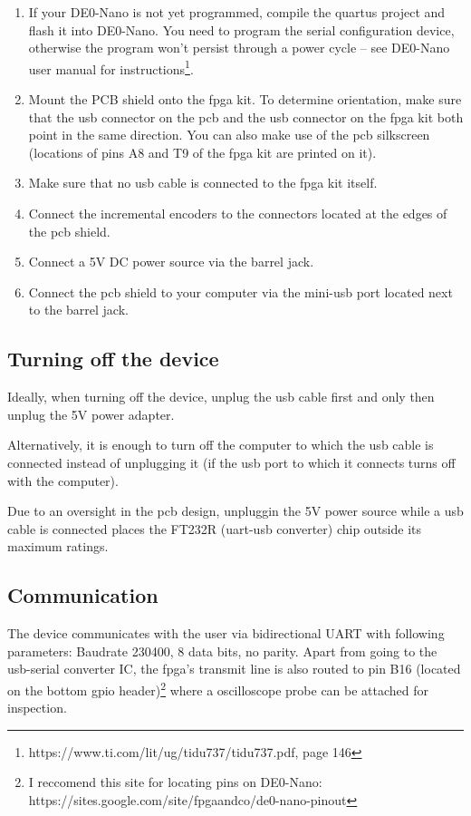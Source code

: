 \documentclass[twoside]{article}
\begin{document}
\begin{enumerate}
\item If your DE0-Nano is not yet programmed, compile the quartus project and flash it into DE0-Nano. You need to program the serial configuration device, otherwise the program won't persist through a power cycle -- see DE0-Nano user manual for instructions\footnote{https://www.ti.com/lit/ug/tidu737/tidu737.pdf, page 146}.
\item Mount the PCB shield onto the fpga kit. To determine orientation, make sure that the usb connector on the pcb and the usb connector on the fpga kit both point in the same direction. You can also make use of the pcb silkscreen (locations of pins A8 and T9 of the fpga kit are printed on it).
\item Make sure that no usb cable is connected to the fpga kit itself.
\item Connect the incremental encoders to the connectors located at the edges of the pcb shield.
\item Connect a 5V DC power source via the barrel jack.
\item Connect the pcb shield to your computer via the mini-usb port located next to the barrel jack.
\end{enumerate}

\subsection{Turning off the device}

Ideally, when turning off the device, unplug the usb cable first and only then unplug the 5V power adapter.

Alternatively, it is enough to turn off the computer to which the usb cable is connected instead of unplugging it (if the usb port to which it connects turns off with the computer).

Due to an oversight in the pcb design, unpluggin the 5V power source while a usb cable is connected places the FT232R (uart-usb converter) chip outside its maximum ratings. 

\newpage{}

\subsection{Communication}

\par The device communicates with the user via bidirectional UART with following parameters: Baudrate 230400, 8 data bits, no parity. Apart from going to the usb-serial converter IC, the fpga's transmit line is also routed to pin B16 (located on the bottom gpio header)\footnote{I reccomend this site for locating pins on DE0-Nano: https://sites.google.com/site/fpgaandco/de0-nano-pinout} where a oscilloscope probe can be attached for inspection.
\end{document}
